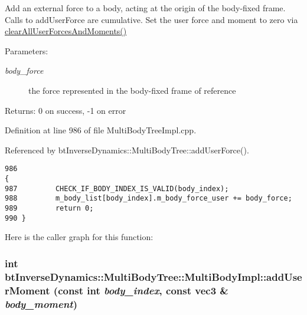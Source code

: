 Add an external force to a body, acting at the origin of the body-fixed frame. Calls to addUserForce are cumulative. Set the user force and moment to zero via \hyperlink{classbt_inverse_dynamics_1_1_multi_body_tree_66402f51ab131c39a4d309196ff7c743}{clearAllUserForcesAndMoments()} \begin{Desc}
\item[Parameters:]
\begin{description}
\item[{\em body\_\-force}]the force represented in the body-fixed frame of reference \end{description}
\end{Desc}
\begin{Desc}
\item[Returns:]0 on success, -1 on error \end{Desc}
 

Definition at line 986 of file MultiBodyTreeImpl.cpp.

Referenced by btInverseDynamics::MultiBodyTree::addUserForce().

\begin{Code}\begin{verbatim}986                                                                                          {
987         CHECK_IF_BODY_INDEX_IS_VALID(body_index);
988         m_body_list[body_index].m_body_force_user += body_force;
989         return 0;
990 }
\end{verbatim}
\end{Code}




Here is the caller graph for this function:\hypertarget{classbt_inverse_dynamics_1_1_multi_body_tree_1_1_multi_body_impl_ef25e8becc20bc0ceb7dcdfd853098e0}{
\subsubsection[addUserMoment]{\setlength{\rightskip}{0pt plus 5cm}int btInverseDynamics::MultiBodyTree::MultiBodyImpl::addUserMoment (const int {\em body\_\-index}, \/  const {\bf vec3} \& {\em body\_\-moment})}}
\label{classbt_inverse_dynamics_1_1_multi_body_tree_1_1_multi_body_impl_ef25e8becc20bc0ceb7dcdfd853098e0}


